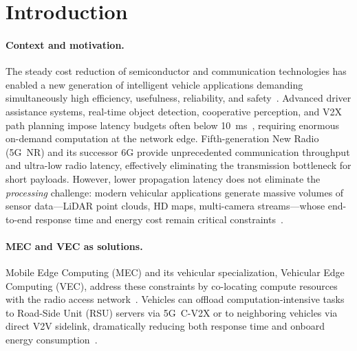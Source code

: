 \documentclass[iicol]{sn-jnl}
\begin{document}

\maketitle

\section{Introduction}
\label{sec:intro}

\paragraph{Context and motivation.}
The steady cost reduction of semiconductor and communication technologies
has enabled a new generation of intelligent vehicle applications demanding
simultaneously high efficiency, usefulness, reliability, and
safety~\cite{uddin2024intelligent}.
Advanced driver assistance systems, real-time object detection, cooperative
perception, and V2X path planning impose latency budgets often below
\SI{10}{\milli\second}~\cite{3gppRel17}, requiring enormous on-demand
computation at the network edge.
Fifth-generation New Radio (5G~NR) and its successor 6G provide unprecedented
communication throughput and ultra-low radio latency, effectively eliminating
the transmission bottleneck for short payloads.
However, lower propagation latency does not eliminate the
\emph{processing} challenge: modern vehicular applications generate massive
volumes of sensor data—LiDAR point clouds, HD maps, multi-camera streams—whose
end-to-end response time and energy cost remain critical
constraints~\cite{zhou2019,zhang2018}.

\paragraph{MEC and VEC as solutions.}
Mobile Edge Computing (MEC) and its vehicular specialization, Vehicular Edge
Computing (VEC), address these constraints by co-locating compute resources with
the radio access network~\cite{mao2017}.
Vehicles can offload computation-intensive tasks to Road-Side Unit (RSU) servers
via 5G~C-V2X or to neighboring vehicles via direct V2V sidelink, dramatically
reducing both response time and onboard energy
consumption~\cite{huang2020,fang2021mec_iot}.
\end{document}
